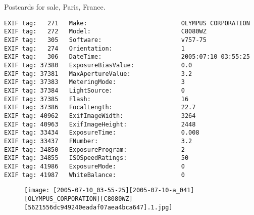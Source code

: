\section{\protect{}}
\noindent Postcards for sale, Paris, France.
\noindent
\begin{lstlisting}
EXIF tag:   271   Make:                          OLYMPUS CORPORATION
EXIF tag:   272   Model:                         C8080WZ
EXIF tag:   305   Software:                      v757-75
EXIF tag:   274   Orientation:                   1
EXIF tag:   306   DateTime:                      2005:07:10 03:55:25
EXIF tag: 37380   ExposureBiasValue:             0.0
EXIF tag: 37381   MaxApertureValue:              3.2
EXIF tag: 37383   MeteringMode:                  3
EXIF tag: 37384   LightSource:                   0
EXIF tag: 37385   Flash:                         16
EXIF tag: 37386   FocalLength:                   22.7
EXIF tag: 40962   ExifImageWidth:                3264
EXIF tag: 40963   ExifImageHeight:               2448
EXIF tag: 33434   ExposureTime:                  0.008
EXIF tag: 33437   FNumber:                       3.2
EXIF tag: 34850   ExposureProgram:               2
EXIF tag: 34855   ISOSpeedRatings:               50
EXIF tag: 41986   ExposureMode:                  0
EXIF tag: 41987   WhiteBalance:                  0

\end{lstlisting}
\clearpage
\begin{figure}
\raggedleft
\texttt{[image: [2005-07-10\_03-55-25][2005-07-10-a\_041][OLYMPUS\_CORPORATION][C8080WZ][5621556dc949240eadaf07aea4bca647].1.jpg]}
\end{figure}


\clearpage

